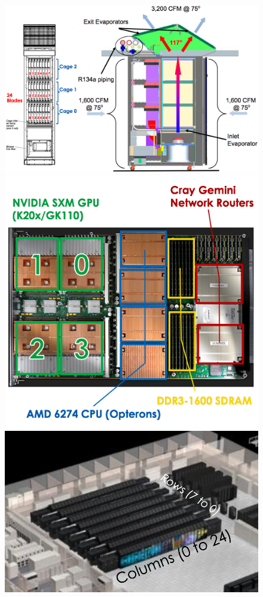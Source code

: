 \begin{figure}
  \centering
  \includegraphics[width=\columnwidth]{figs/TitanCabinet.png}
  \begin{minipage}{0.35\columnwidth}
    \includegraphics[width=\columnwidth]{figs/TitanBlade.png}
  \end{minipage}
  \hfil
  \begin{minipage}{0.49\columnwidth}
    \includegraphics[width=\columnwidth]{figs/TitanLayout.png}

\end{minipage}
\end{figure}
